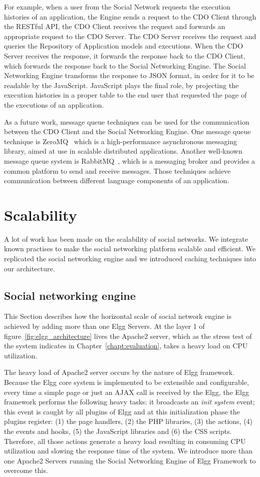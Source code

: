 For example, when a user from the Social Network requests the execution histories of an application, the Engine sends a request to the CDO Client through the RESTful API, the CDO Client receives the request and forwards an appropriate request to the CDO Server. The CDO Server receives the request and queries the Repository of Application models and executions. When the CDO Server receives the response, it forwards the response back to the CDO Client, which forwards the response back to the Social Networking Engine. The Social Networking Engine transforms the response to JSON format, in order for it to be readable by the JavaScript. JavaScript plays the final role, by projecting the execution histories in a proper table to the end user that requested the page of the executions of an application.

As a future work, message queue techniques can be used for the communication between the CDO Client and the Social Networking Engine. One message queue technique is ZeroMQ~\cite{zeromq_url} which is a high-performance asynchronous messaging library, aimed at use in scalable distributed applications. Another well-known message queue system is RabbitMQ~\cite{rabbitmq_url}, which is a messaging broker and provides a common platform to send and receive messages. Those techniques achieve communication between different language components of an application.

\section{Scalability}
A lot of work has been made on the scalability of social networks. We integrate known practises to make the social networking platform scalable and efficient. We replicated the social networking engine and we introduced caching techniques into our architecture.

\subsection{Social networking engine}
\label{sec:engine_scale}
This Section describes how the horizontal scale of social network engine is achieved by adding more than one Elgg Servers. At the layer 1 of figure~\ref{fig:elgg_architecture} lives the Apache2 server, which as the stress test of the system indicates in Chapter~\ref{chapt:evaluation}, takes a heavy load on CPU utilization. 

The heavy load of Apache2 server occurs by the nature of Elgg framework. Because the Elgg core system is implemented to be extensible and configurable, every time a simple page or just an AJAX call is received by the Elgg, the Elgg framework performs the following heavy tasks: it broadcasts an {\it init system} event; this event is caught by all plugins of Elgg and at this initialization phase the plugins register: (1) the page handlers, (2) the PHP libraries, (3) the actions, (4) the events and hooks, (5) the JavaScript libraries and (6) the CSS scripts. Therefore, all those actions generate a heavy load resulting in consuming CPU utilization and slowing the response time of the system. We introduce more than one Apache2 Servers running the Social Networking Engine of Elgg Framework to overcome this.  

